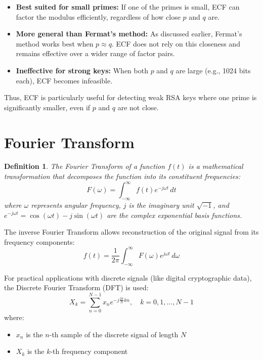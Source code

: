 \documentclass{article}
\newtheorem{definition}{Definition}
\begin{document}
\begin{itemize}
    \item \textbf{Best suited for small primes:} If one of the primes is small, ECF can factor the modulus efficiently, regardless of how close \( p \) and \( q \) are.
    \item \textbf{More general than Fermat's method:} As discussed earlier, Fermat's method works best when \( p \approx q \). ECF does not rely on this closeness and remains effective over a wider range of factor pairs.
    \item \textbf{Ineffective for strong keys:} When both \( p \) and \( q \) are large (e.g., 1024 bits each), ECF becomes infeasible.
\end{itemize}

\noindent Thus, ECF is particularly useful for detecting weak RSA keys where one prime is significantly smaller, even if \( p \) and \( q \) are not close.


\section{Fourier Transform}

\begin{definition}
    The Fourier Transform of a function $f(t)$ is a mathematical transformation that decomposes the function into its constituent frequencies:
    \[
        F(\omega) = \int_{-\infty}^{\infty} f(t) e^{-j\omega t} \, dt
    \]
    where $\omega$ represents angular frequency, $j$ is the imaginary unit $\sqrt{-1}$, and $e^{-j\omega t} = \cos(\omega t) - j\sin(\omega t)$ are the complex exponential basis functions.
\end{definition}

The inverse Fourier Transform allows reconstruction of the original signal from its frequency components:
\[
    f(t) = \frac{1}{2\pi} \int_{-\infty}^{\infty} F(\omega) e^{j\omega t} \, d\omega
\]

For practical applications with discrete signals (like digital cryptographic data), the Discrete Fourier Transform (DFT) is used:
\[
    X_k = \sum_{n=0}^{N-1} x_n e^{-j \frac{2\pi}{N} kn}, \quad k = 0,1,\ldots,N-1
\]
where:
\begin{itemize}
    \item $x_n$ is the $n$-th sample of the discrete signal of length $N$
    \item $X_k$ is the $k$-th frequency component
\end{itemize}
\end{document}
